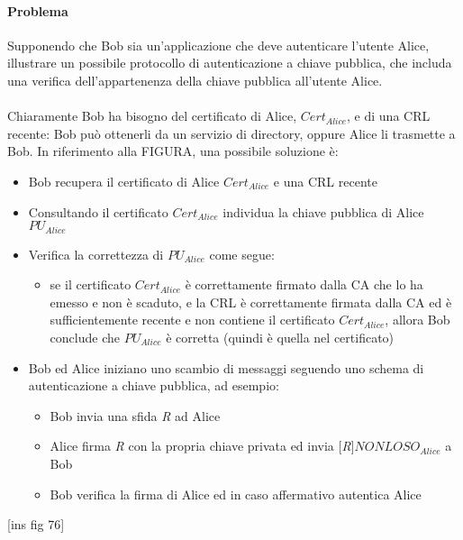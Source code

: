 \paragraph{Problema}
Supponendo che Bob sia un'applicazione che deve autenticare l'utente Alice, illustrare un possibile protocollo di
autenticazione a chiave pubblica, che includa una verifica dell'appartenenza della chiave pubblica all'utente Alice.
\\ \\
Chiaramente Bob ha bisogno del certificato di Alice, \textit{$Cert_{Alice}$}, e di una CRL recente: Bob può ottenerli da un servizio di directory, oppure Alice li trasmette a Bob. 
In riferimento alla FIGURA, una possibile soluzione è:
\begin{itemize}
\item Bob recupera il certificato di Alice \textit{$Cert_{Alice}$} e una CRL recente
\item Consultando il certificato \textit{$Cert_{Alice}$} individua la chiave pubblica di Alice \textit{$PU_{Alice}$}
\item Verifica la correttezza di \textit{$PU_{Alice}$} come segue:
\begin{itemize}
\item se il certificato \textit{$Cert_{Alice}$} è correttamente firmato dalla CA che lo ha emesso e non è scaduto, e
la CRL è correttamente firmata dalla CA ed è sufficientemente recente e non contiene il certificato \textit{$Cert_{Alice}$}, allora Bob conclude che \textit{$PU_{Alice}$} è corretta (quindi è quella nel certificato)
\end{itemize}
\item Bob ed Alice iniziano uno scambio di messaggi seguendo uno schema di autenticazione a chiave pubblica, ad esempio:
\begin{itemize}
\item Bob invia una sfida \textit{R} ad Alice
\item Alice firma \textit{R} con la propria chiave privata ed invia [\textit{R}]\textit{$NONLOSO_{Alice}$} a Bob
\item Bob verifica la firma di Alice ed in caso affermativo autentica Alice
\end{itemize}
\end{itemize}
[ins fig 76]

